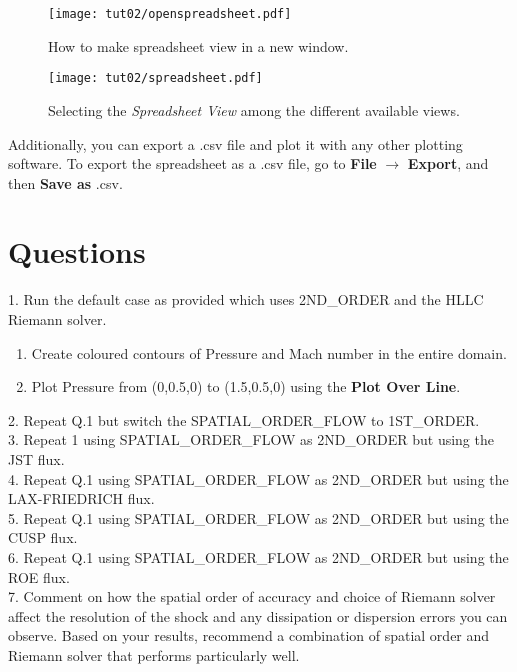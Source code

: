 \begin{figure}[htbp]
    \centering
    \texttt{[image: tut02/openspreadsheet.pdf]}
    \caption{How to make spreadsheet view in a new window.}
    \label{fig2:open_spreadsheet}
\end{figure}
\begin{figure}[htbp]
    \centering
    \texttt{[image: tut02/spreadsheet.pdf]}
    \caption{Selecting the \textit{Spreadsheet View} among the different available views.}
    \label{fig2:spreadsheet}
\end{figure}
Additionally, you can export a .csv file and plot it with any other plotting software. To export the spreadsheet as a .csv file, go to \textbf{File} $\rightarrow$ \textbf{Export}, and then \textbf{Save as} .csv.
\clearpage
\section{Questions}
1. Run the default case as provided which uses 2ND\_ORDER and the HLLC Riemann solver.
\begin{enumerate}[label=(\alph*)]
    \item Create coloured contours of Pressure and Mach number in the entire domain.
    \item Plot Pressure from (0,0.5,0) to (1.5,0.5,0) using the \textbf{Plot Over Line}.
\end{enumerate}
2. Repeat Q.1 but switch the SPATIAL\_ORDER\_FLOW to 1ST\_ORDER. \\
3. Repeat 1 using SPATIAL\_ORDER\_FLOW as 2ND\_ORDER but using the JST flux. \\
4. Repeat Q.1 using SPATIAL\_ORDER\_FLOW as 2ND\_ORDER but using the LAX-FRIEDRICH flux. \\
5. Repeat Q.1 using SPATIAL\_ORDER\_FLOW as 2ND\_ORDER but using the CUSP flux. \\
6. Repeat Q.1 using SPATIAL\_ORDER\_FLOW as 2ND\_ORDER but using the ROE flux. \\
7. Comment on how the spatial order of accuracy and choice of Riemann solver affect the resolution of the shock and any dissipation or dispersion errors you can observe. Based on your results, recommend a combination of spatial order and Riemann solver that performs particularly well.
